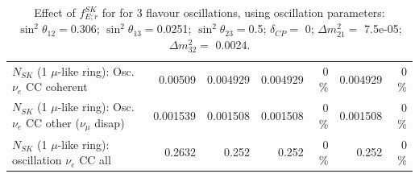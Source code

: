 \begin{table}
\begin{tabular}{| l | r | r | r  r | r  r |}
                          $N_{SK}$ (1 $\mu$-like ring): Osc. $\nu_e$ CC coherent &         0.00509 &        0.004929 &        0.004929 &        0 \%  &        0.004929 &        0 \%  \\ 
           $N_{SK}$ (1 $\mu$-like ring): Osc. $\nu_e$ CC other ($\nu_\mu$ disap) &        0.001539 &        0.001508 &        0.001508 &        0 \%  &        0.001508 &        0 \%  \\ 
                        $N_{SK}$ (1 $\mu$-like ring): oscillation $\nu_e$ CC all &          0.2632 &           0.252 &           0.252 &        0 \%  &           0.252 &        0 \%  \\ 
\hline
\hline
\end{tabular}
\caption{ Effect of $f_{E; r}^{SK}$   for for 3 flavour oscillations, using oscillation parameters:  $\sin^2\theta_{12} = $0.306; $\sin^2\theta_{13} = $0.0251; $\sin^2\theta_{23} = $0.5; $\delta_{CP} = $        0; $\Delta m^2_{21} = $    7.5e-05; $\Delta m^2_{32} = $    0.0024. }
\label{tab:num_sk_energy_scale_1RmuT_3f_osc_t13:0.0251_spectralreco_spectraltrue}
\end{table}
\clearpage
